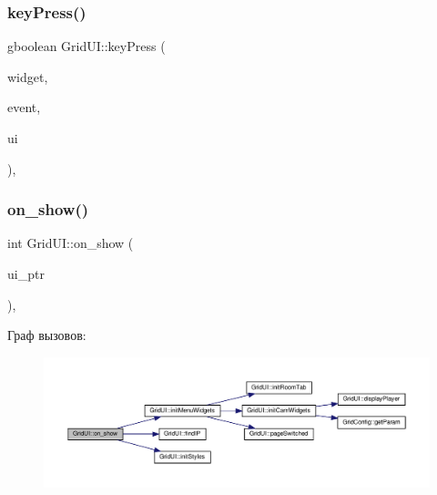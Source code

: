 \mbox{\label{class_grid_u_i_acb700da4a4b35b9a142eff7537a67d6e}} 
\subsubsection{\texorpdfstring{key\+Press()}{keyPress()}}
{\footnotesize\ttfamily gboolean Grid\+U\+I\+::key\+Press (\begin{DoxyParamCaption}\item[{Gtk\+Widget $\ast$}]{widget,  }\item[{Gdk\+Event\+Key $\ast$}]{event,  }\item[{\hyperlink{class_grid_u_i}{Grid\+UI} $\ast$}]{ui }\end{DoxyParamCaption})\hspace{0.3cm}{\ttfamily [static]}, {\ttfamily [private]}}

\mbox{\label{class_grid_u_i_aacb45638d1ac54877cbc516ce220b361}} 
\subsubsection{\texorpdfstring{on\+\_\+show()}{on\_show()}}
{\footnotesize\ttfamily int Grid\+U\+I\+::on\+\_\+show (\begin{DoxyParamCaption}\item[{gpointer}]{ui\+\_\+ptr }\end{DoxyParamCaption})\hspace{0.3cm}{\ttfamily [static]}, {\ttfamily [private]}}

Граф вызовов\+:\nopagebreak
\begin{figure}[H]
\begin{center}
\leavevmode
\includegraphics[width=350pt]{class_grid_u_i_aacb45638d1ac54877cbc516ce220b361_cgraph}
\end{center}
\end{figure}
\mbox{\label{class_grid_u_i_a6d9d6f5fe5e1b00460f25d394920f977}} 
